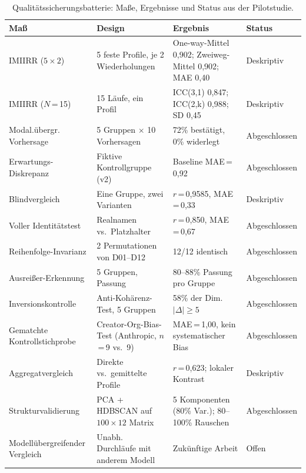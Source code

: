 \documentclass[11pt,a4paper]{article}
\begin{document}
\begin{table}[htbp]
  \centering
  \caption{Qualitätssicherungsbatterie: Maße, Ergebnisse und Status aus der Pilotstudie.}
  \label{tab:validation}
  \scriptsize
  \begin{tabularx}{\textwidth}{@{} L{2.7cm} Y Y L{1.8cm} @{}}
    \toprule
    \textbf{Maß} & \textbf{Design} & \textbf{Ergebnis} & \textbf{Status} \\
    \midrule
    IMIIRR ($5 \times 2$) & 5 feste Profile, je 2 Wiederholungen & One-way-Mittel 0,902; Zweiweg-Mittel 0,902; MAE 0,40 & Deskriptiv \\[3pt]
    IMIIRR ($N$\,=\,15) & 15 Läufe, ein Profil & ICC(3,1) 0,847; ICC(2,k) 0,988; SD 0,45 & Deskriptiv \\[3pt]
    Modal.übergr. Vorhersage & 5 Gruppen $\times$ 10 Vorhersagen & 72\% bestätigt, 0\% widerlegt & Abgeschlossen \\[3pt]
    Erwartungs-Diskrepanz & Fiktive Kontrollgruppe (v2) & Baseline MAE\,=\,0,92 & Abgeschlossen \\[3pt]
    Blindvergleich & Eine Gruppe, zwei Varianten & $r$\,=\,0,9585, MAE\,=\,0,33 & Deskriptiv \\[3pt]
    Voller Identitätstest & Realnamen vs.\ Platzhalter & $r$\,=\,0,850, MAE\,=\,0,67 & Abgeschlossen \\[3pt]
    Reihenfolge-Invarianz & 2 Permutationen von D01--D12 & 12/12 identisch & Abgeschlossen \\[3pt]
    Ausreißer-Erkennung & 5 Gruppen, Passung & 80--88\% Passung pro Gruppe & Abgeschlossen \\[3pt]
    Inversionskontrolle & Anti-Kohärenz-Test, 5 Gruppen & 58\% der Dim. $|\Delta| \geq 5$ & Abgeschlossen \\[3pt]
    Gematchte Kontrollstichprobe & Creator-Org-Bias-Test (Anthropic, $n$\,=\,9 vs.\ 9) & MAE\,=\,1,00, kein systematischer Bias & Abgeschlossen \\[3pt]
    Aggregatvergleich & Direkte vs.\ gemittelte Profile & $r$\,=\,0,623; lokaler Kontrast & Deskriptiv \\[3pt]
    Strukturvalidierung & PCA + HDBSCAN auf $100 \times 12$ Matrix & 5 Komponenten (80\% Var.); 80--100\% Rauschen & Abgeschlossen \\[3pt]
    Modellübergreifender Vergleich & Unabh. Durchläufe mit anderem Modell & Zukünftige Arbeit & Offen \\
    \bottomrule
  \end{tabularx}
\end{table}
\end{document}
